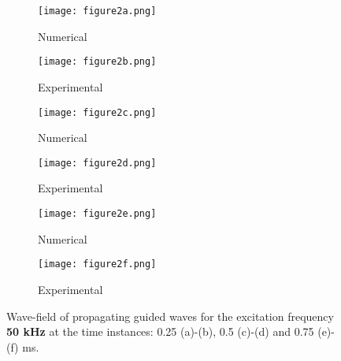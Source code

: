 \documentclass[runningheads]{llncs}
\begin{document}
\begin{figure} [h!]
	\centering
	\begin{subfigure}[b]{0.49\textwidth}
		\centering
		\texttt{[image: figure2a.png]}
		\caption{Numerical}
		\label{fig:wavefield50a}
	\end{subfigure}
	\begin{subfigure}[b]{0.49\textwidth}
		\centering
		\texttt{[image: figure2b.png]}
		\caption{Experimental}
		\label{fig:wavefield50b}
	\end{subfigure}
	\begin{subfigure}[b]{0.49\textwidth}
		\centering
		\texttt{[image: figure2c.png]}
		\caption{Numerical}
		\label{fig:wavefield50c}
	\end{subfigure}
	\begin{subfigure}[b]{0.49\textwidth}
		\centering
		\texttt{[image: figure2d.png]}
		\caption{Experimental}
		\label{fig:wavefield50d}
	\end{subfigure}
	\begin{subfigure}[b]{0.49\textwidth}
		\centering
		\texttt{[image: figure2e.png]}
		\caption{Numerical}
		\label{fig:wavefield50e}
	\end{subfigure}
	\begin{subfigure}[b]{0.49\textwidth}
		\centering
		\texttt{[image: figure2f.png]}
		\caption{Experimental}
		\label{fig:wavefield50f}
	\end{subfigure}
	\caption{Wave-field of propagating guided waves for the excitation frequency \textbf{50 kHz} at the time instances:  0.25 (a)-(b), 0.5 (c)-(d) and 0.75 (e)-(f) ms. }
	\label{fig:wavefield50}
\end{figure}
\end{document}
